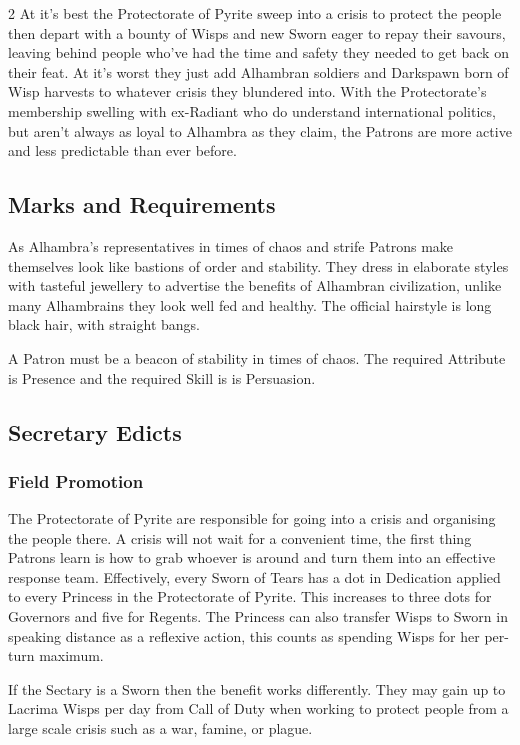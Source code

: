 \begin{multicols}{2}
At it's best the Protectorate of Pyrite sweep into a crisis to protect the people then depart with a bounty of Wisps and new Sworn eager to repay their savours, leaving behind people who've had the time and safety they needed to get back on their feat. At it's worst they just add Alhambran soldiers and Darkspawn born of Wisp harvests to whatever crisis they blundered into. With the Protectorate's membership swelling with ex-Radiant who do understand international politics, but aren't always as loyal to Alhambra as they claim, the Patrons are more active and less predictable than ever before. 

\subsection*{Marks and Requirements}

As Alhambra's representatives in times of chaos and strife Patrons make themselves look like bastions of order and stability. They dress in elaborate styles with tasteful jewellery to advertise the benefits of Alhambran civilization, unlike many Alhambrains they look well fed and healthy. The official hairstyle is long black hair, with straight bangs. 

A Patron must be a beacon of stability in times of chaos. The required Attribute is Presence and the required Skill is is Persuasion. 

\subsection*{Secretary Edicts}

\subsubsection*{Field Promotion}

The Protectorate of Pyrite are responsible for going into a crisis and organising the people there. A crisis will not wait for a convenient time, the first thing Patrons learn is how to grab whoever is around and turn them into an effective response team. Effectively, every Sworn of Tears has a dot in Dedication applied to every Princess in the Protectorate of Pyrite. This increases to three dots for Governors and five for Regents. The Princess can also transfer Wisps to Sworn in speaking distance as a reflexive action, this counts as spending Wisps for her per-turn maximum. 

If the Sectary is a Sworn then the benefit works differently. They may gain up to Lacrima Wisps per day from Call of Duty when working to protect people from a large scale crisis such as a war, famine, or plague. 


\end{multicols}
